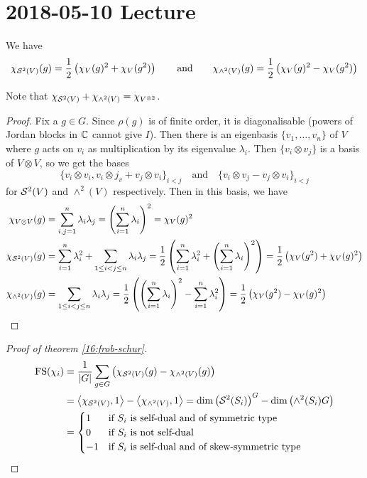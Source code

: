 \section{2018-05-10 Lecture}

\begin{lem}
  We have
  \[\chi_{\mathcal{S}^2(V)}(g) = \frac 12 \left( \chi_V(g)^2+\chi_V(g^2) \right) \qquad\text{and}\qquad \chi_{\wedge^2(V)}(g) = \frac 12 \left( \chi_V(g)^2-\chi_V(g^2) \right)\]
\end{lem}

\begin{rmk}
  Note that $\chi_{\mathcal{S}^2(V)} + \chi_{\wedge^2(V)} = \chi_{V^{\otimes 2}}$.
\end{rmk}

\begin{proof}
  Fix a $g \in G$.
  Since $\rho(g)$ is of finite order, it is diagonalisable (powers of Jordan blocks in $\mathbb{C}$ cannot give $I$).
  Then there is an eigenbasis $\{v_1,\ldots,v_n\}$ of $V$ where $g$ acts on $v_i$ as multiplication by its eigenvalue $\lambda_i$.
  Then $\{v_i \otimes v_j\}$ is a basis of $V \otimes V$, so we get the bases
  \[ \{ v_i \otimes v_i, v_i \otimes j_v + v_j \otimes v_i \}_{i<j} \quad\text{and}\quad \{v_i \otimes v_j - v_j \otimes v_i \}_{i<j} \]
  for $\mathcal{S}^2(V)$ and $\wedge^2(V)$ respectively.
  Then in this basis, we have
  \begin{align*}
    \chi_{V \otimes V}(g) &= \sum_{i,j=1}^n \lambda_i\lambda_j = \left( \sum_{i=1}^n \lambda_i \right)^2 = \chi_V(g)^2 \\
    \chi_{\mathcal{S}^2(V)}(g) &= \sum_{i=1}^n \lambda_i^2 + \sum_{1 \leq i<j \leq n} \lambda_i\lambda_j = \frac 12 \left( \sum_{i=1}^n \lambda_i^2 + \left( \sum_{i=1}^n \lambda_i \right)^2 \right) = \frac 12 \left( \chi_V(g^2) + \chi_V(g)^2 \right) \\
    \chi_{\wedge^2(V)}(g) &= \sum_{1 \leq i<j \leq n} \lambda_i\lambda_j = \frac 12 \left( \left( \sum_{i=1}^n \lambda_i \right)^2 - \sum_{i=1}^n \lambda_i^2 \right) = \frac 12 \left( \chi_V(g^2) - \chi_V(g)^2 \right) \qedhere
  \end{align*}
\end{proof}

\begin{proof}[Proof of theorem \ref{16:frob-schur}]
  \begin{align*}
    \operatorname{FS}(\chi_i) &= \frac{1}{\left\lvert G \right\rvert} \sum_{g \in G} \left( \chi_{\mathcal{S}^2(V)}(g) - \chi_{\wedge^2(V)}(g) \right) \\
    &= {\left\langle \chi_{\mathcal{S}^2(V)},1 \right\rangle} - {\left\langle \chi_{\wedge^2(V)},1 \right\rangle} = \dim \left( \mathcal{S}^2(S_i) \right)^G - \dim \left( \wedge^2(S_i)G \right) \\
    &=
    \begin{cases}
      1 & \text{if $S_i$ is self-dual and of symmetric type} \\
      0 & \text{if $S_i$ is not self-dual} \\
      -1 & \text{if $S_i$ is self-dual and of skew-symmetric type}
    \end{cases}
    \qedhere
  \end{align*}
\end{proof}

